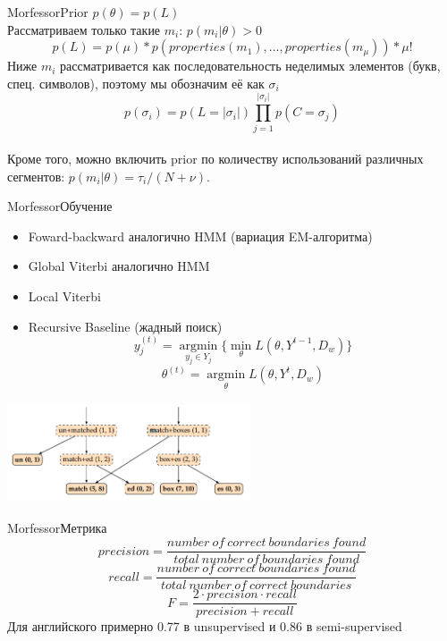\documentclass[10pt]{beamer}
\begin{document}
\begin{frame}[fragile]{Morfessor}{Prior}
$p(\theta) = p(L)$\\
Рассматриваем только такие $m_i$: $p(m_i | \theta) > 0 $\\
$$p(L) = p(\mu) * p(properties(m_1), \dots, properties(m_{\mu})) * \mu!$$
Ниже $m_i$ рассматривается как последовательность неделимых элементов (букв, спец. символов), поэтому мы обозначим её как $\sigma_i$
$$p(\sigma_i) = p(L = |\sigma_i|)\prod_{j=1}^{|\sigma_i|}p(C = \sigma_{j})$$\\
Кроме того, можно включить prior по количеству использований различных сегментов: $p(m_i | \theta) = \tau_i/(N + \nu)$.
\end{frame}

\begin{frame}[fragile]{Morfessor}{Обучение}
\begin{itemize}
    \item Foward-backward аналогично HMM (вариация EM-алгоритма)
    \item Global Viterbi аналогично HMM
    \item Local Viterbi
    \item Recursive Baseline (жадный поиск)
        $$ y_j^{(t)} =  \operatorname*{argmin}_{y_j \in Y_j} \{ \min_{\theta} L(\theta, Y^{t-1}, D_w) \} $$ 
        $$ \theta^{(t)} = \operatorname*{argmin}_\theta  L(\theta, Y^{t}, D_w) $$
\end{itemize}
\begin{center}
    \includegraphics[width=7.2cm, height=3cm]{ComputationalLinguistics/Pictures/morph.png}
\end{center}

\end{frame}

\begin{frame}[fragile]{Morfessor}{Метрика}
$$precision = \frac{number\ of\ correct\ boundaries\ found}{total\ number\ of\ boundaries\ found}$$
$$recall = \frac{number\ of\ correct\ boundaries\ found}{total\ number\ of\ correct\ boundaries} $$
$$F = \frac{2 \cdot precision \cdot recall}{precision + recall}$$
Для английского примерно 0.77 в unsupervised и 0.86 в semi-supervised
\end{frame}
\end{document}

